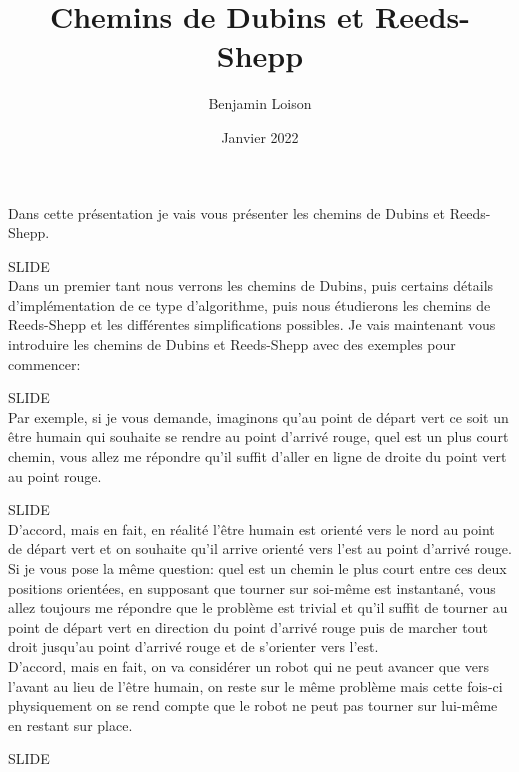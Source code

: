 \documentclass[12pt,a4paper]{article}
\newcommand{\slide}{\vspace{0.6cm}SLIDE\\}
\begin{document}
	\title{Chemins de Dubins et Reeds-Shepp}
	\author{Benjamin Loison}
	\date{Janvier 2022}
	\maketitle

	\setlength{\parindent}{0cm}
	
	
	Dans cette présentation je vais vous présenter les chemins de Dubins et Reeds-Shepp.
	
	\slide
	
	Dans un premier tant nous verrons les chemins de Dubins, puis certains détails d'implémentation de ce type d'algorithme, puis nous étudierons les chemins de Reeds-Shepp et les différentes simplifications possibles.
	Je vais maintenant vous introduire les chemins de Dubins et Reeds-Shepp avec des exemples pour commencer:
	
	\slide
	
	Par exemple, si je vous demande, imaginons qu'au point de départ vert ce soit un être humain qui souhaite se rendre au point d'arrivé rouge, quel est un plus court chemin, vous allez me répondre qu'il suffit d'aller en ligne de droite du point vert au point rouge.
	
	\slide
	
	D'accord, mais en fait, en réalité l'être humain est orienté vers le nord au point de départ vert et on souhaite qu'il arrive orienté vers l'est au point d'arrivé rouge. Si je vous pose la même question: quel est un chemin le plus court entre ces deux positions orientées, en supposant que tourner sur soi-même est instantané, vous allez toujours me répondre que le problème est trivial et qu'il suffit de tourner au point de départ vert en direction du point d'arrivé rouge puis de marcher tout droit jusqu'au point d'arrivé rouge et de s'orienter vers l'est.\\
	
	
	D'accord, mais en fait, on va considérer un robot qui ne peut avancer que vers l'avant au lieu de l'être humain, on reste sur le même problème mais cette fois-ci physiquement on se rend compte que le robot ne peut pas tourner sur lui-même en restant sur place.
	
	\slide
	
\end{document}
